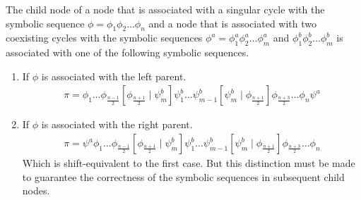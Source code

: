 \begin{theorem}
	\label{theorem:child.symbolic.2}
	The child node of a node that is associated with a singular cycle with the symbolic sequence $\phi = \phi_1\phi_2 \dots \phi_n$ and a node that is associated with two coexisting cycles with the symbolic sequences $\phi^a = \phi^a_1\phi^a_2 \dots \phi^a_m$ and $\phi^b_1\phi^b_2 \dots \phi^b_m$ is associated with one of the following symbolic sequences.
	\begin{enumerate}
		\item If $\phi$ is associated with the left parent.
		      \begin{align}
			      \pi =
			      \phi_1 \dots \phi_{\frac{n-1}{2}} \left[\phi_{\frac{n+1}{2}} \mid \psi^b_m\right]
			      \psi^b_1 \dots \psi^b_{m-1} \left[\psi^b_m \mid \phi_{\frac{n+1}{2}}\right]
			      \phi_{\frac{n+3}{2}} \dots \phi_n \psi^a
		      \end{align}
		\item If $\phi$ is associated with the right parent.
		      \begin{align}
			      \pi =
			      \psi^a \phi_1 \dots \phi_{\frac{n-1}{2}} \left[\phi_{\frac{n+1}{2}} \mid \psi^b_m\right]
			      \psi^b_1 \dots \psi^b_{m-1} \left[\psi^b_m \mid \phi_{\frac{n+1}{2}}\right]
			      \phi_{\frac{n+3}{2}} \dots \phi_n
		      \end{align}
		      Which is shift-equivalent to the first case.
		      But this distinction must be made to guarantee the correctness of the symbolic sequences in subsequent child nodes.
	\end{enumerate}
\end{theorem}

